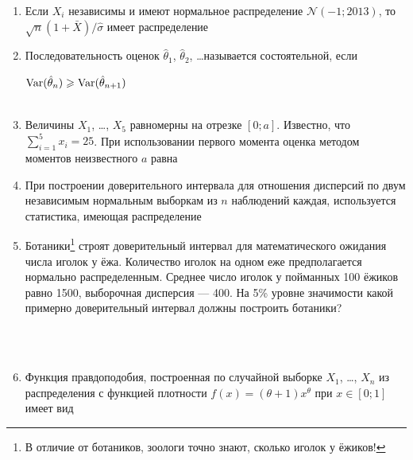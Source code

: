 \documentclass[12pt, a4paper]{article}\usepackage[]{graphicx}\usepackage[]{color}
\newcommand{\cN}{\mathcal{N}}
\begin{document}
\begin{enumerate}

\item Если $X_i$ независимы и имеют нормальное распределение $\cN(-1;2013)$, то $\sqrt{n}(1+\bar{X})/\hat{\sigma}$ имеет распределение

\otvet{$\cN(0;1)$}{$t_{n-1}$}{$\chi^2_{n-1}$}{$\cN(0;2013/n)$}{$t_n$}

\item Последовательность оценок $\hat{\theta}_1$, $\hat{\theta}_2$, \ldots называется состоятельной, если

{$\operatorname{Var}(\hat{\theta}_n)\geqslant \operatorname{Var}(\hat{\theta}_{n+1})$} \\ \\

\item Величины $X_1$, \ldots, $X_5$ равномерны на отрезке $[0;a]$. Известно, что $\sum_{i=1}^5 x_i=25$. При использовании первого момента оценка методом моментов неизвестного $a$ равна


\item При построении доверительного интервала для отношения дисперсий по двум независимым нормальным выборкам из $n$ наблюдений каждая, используется статистика, имеющая распределение


\item Ботаники\footnote{В отличие от ботаников, зоологи точно знают, сколько иголок у ёжиков!} строят доверительный интервал для математического ожидания числа иголок у ёжа. Количество иголок на одном еже предполагается нормально распределенным. Среднее число иголок у пойманных 100 ёжиков равно 1500, выборочная дисперсия — 400. На 5\% уровне значимости какой примерно доверительный интервал должны построить ботаники?


\\ \\

\item Функция правдоподобия, построенная по случайной выборке $X_1$, \ldots, $X_n$ из распределения с функцией плотности $f(x)=(\theta+1)x^{\theta}$ при $x\in [0;1]$ имеет вид


\end{enumerate}
\end{document}
